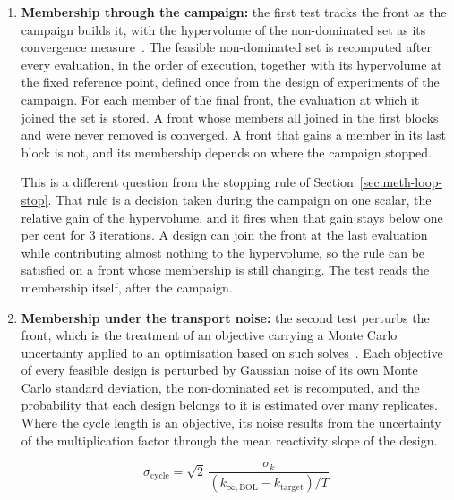 \begin{enumerate}
  \item \textbf{Membership through the campaign:} the first test
        tracks the front as the campaign builds it, with the
        hypervolume of the non-dominated set as its convergence
        measure~\cite{coello_2007}. The feasible non-dominated set is
        recomputed after every evaluation, in the order of execution,
        together with its hypervolume at the fixed reference point,
        defined once from the design of experiments of the campaign.
        For each member of the final front, the evaluation at which it
        joined the set is stored. A front whose
        members all joined in the first blocks and were never removed
        is converged. A front that gains a member in its last block is
        not, and its membership depends on where the campaign stopped.

        This is a different question from the stopping rule of
        Section~\ref{sec:meth-loop-stop}. That rule is a decision taken
        during the campaign on one scalar, the relative gain of the
        hypervolume, and it fires when that gain stays below one per
        cent for 3 iterations. A design can join the front at the
        last evaluation while contributing almost nothing to the
        hypervolume, so the rule can be satisfied on a front whose membership
        is still changing. The test reads the membership itself, after
        the campaign.

  \item \textbf{Membership under the transport noise:} the second test
        perturbs the front, which is the treatment of an objective
        carrying a Monte Carlo uncertainty applied to an optimisation
        based on such solves~\cite{erdem_2025_mc_uncertainty}. Each
        objective of every feasible design is perturbed by Gaussian
        noise of its own Monte Carlo standard deviation, the non-dominated set is recomputed, and the
        probability that each design belongs to it is estimated over
        many replicates. Where the cycle length is an objective, its noise results
        from the uncertainty of the multiplication factor through the mean reactivity
        slope of the design.

        \begin{equation}
          \sigma_{\mathrm{cycle}} = \sqrt{2}\,\frac{\sigma_k}{\left(k_{\infty,\mathrm{BOL}} - k_{\mathrm{target}}\right)/T}
          \label{eq:val-sigma-cycle}
        \end{equation}


\end{enumerate}
